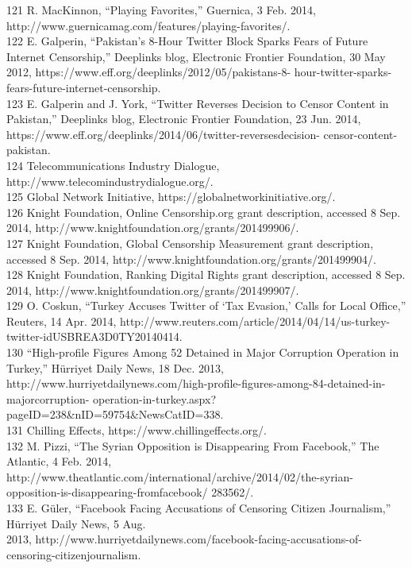 121 R. MacKinnon, ``Playing Favorites,'' Guernica, 3 Feb. 2014,
http://www.guernicamag.com/features/playing-favorites/.\\
122 E. Galperin, ``Pakistan’s 8-Hour Twitter Block Sparks Fears of Future Internet Censorship,'' Deeplinks
blog, Electronic Frontier Foundation, 30 May 2012, https://www.eff.org/deeplinks/2012/05/pakistans-8-
hour-twitter-sparks-fears-future-internet-censorship.\\
123 E. Galperin and J. York, ``Twitter Reverses Decision to Censor Content in Pakistan,'' Deeplinks blog,
Electronic Frontier Foundation, 23 Jun. 2014, https://www.eff.org/deeplinks/2014/06/twitter-reversesdecision-
censor-content-pakistan.\\
124 Telecommunications Industry Dialogue, http://www.telecomindustrydialogue.org/.\\
125 Global Network Initiative, https://globalnetworkinitiative.org/.\\
126 Knight Foundation, Online Censorship.org grant description, accessed 8 Sep. 2014,
http://www.knightfoundation.org/grants/201499906/.\\
127 Knight Foundation, Global Censorship Measurement grant description, accessed 8 Sep. 2014,
http://www.knightfoundation.org/grants/201499904/.\\
128 Knight Foundation, Ranking Digital Rights grant description, accessed 8 Sep. 2014,
http://www.knightfoundation.org/grants/201499907/.\\
129 O. Coskun, ``Turkey Accuses Twitter of ‘Tax Evasion,’ Calls for Local Office,'' Reuters, 14 Apr. 2014,
http://www.reuters.com/article/2014/04/14/us-turkey-twitter-idUSBREA3D0TY20140414.\\
130 ``High-profile Figures Among 52 Detained in Major Corruption Operation in Turkey,'' Hürriyet Daily
News, 18 Dec. 2013, http://www.hurriyetdailynews.com/high-profile-figures-among-84-detained-in-majorcorruption-
operation-in-turkey.aspx?pageID=238&nID=59754&NewsCatID=338.\\
131 Chilling Effects, https://www.chillingeffects.org/.\\
132 M. Pizzi, ``The Syrian Opposition is Disappearing From Facebook,'' The Atlantic, 4 Feb. 2014,
http://www.theatlantic.com/international/archive/2014/02/the-syrian-opposition-is-disappearing-fromfacebook/
283562/.\\
133 E. Güler, ``Facebook Facing Accusations of Censoring Citizen Journalism,'' Hürriyet Daily News, 5 Aug.\\
2013, http://www.hurriyetdailynews.com/facebook-facing-accusations-of-censoring-citizenjournalism.\\
